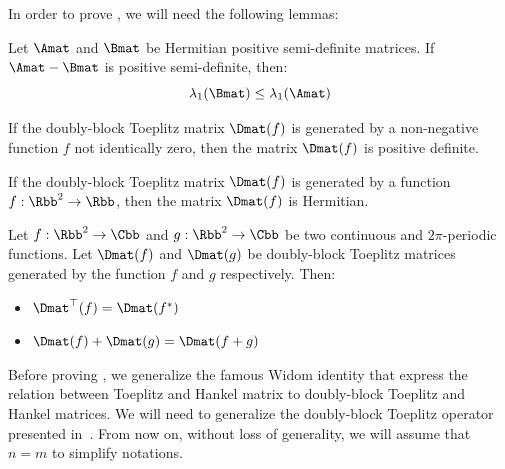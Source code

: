 In order to prove , we will need the following lemmas:

\begin{lemma} \label{theorem:diff_positive_semidefinite_matrices}
Let $\Amat$ and $\Bmat$ be Hermitian positive semi-definite matrices. If $\Amat - \Bmat$ is positive semi-definite, then:
  \begin{equation}
      \lambda_1 \left( \Bmat \right) \leq \lambda_1 \left( \Amat \right)
  \end{equation}
  \removespace
\end{lemma}

\begin{lemma} \label{theorem:block_toeplitz_positive_definite}
  If the doubly-block Toeplitz matrix $\Dmat(f)$ is generated by a non-negative function $f$ not identically zero, then the matrix $\Dmat(f)$ is positive definite. 
\end{lemma}

\begin{lemma} \label{theorem:block_toeplitz_hermitian}
  If the doubly-block Toeplitz matrix $\Dmat(f)$ is generated by a function $f: \Rbb^2 \rightarrow \Rbb$, then the matrix $\Dmat(f)$ is Hermitian. 
\end{lemma}

\begin{lemma} \label{theorem:properties_block_toeplitz}
  Let $f:\Rbb^2 \rightarrow \Cbb$ and $g:\Rbb^2 \rightarrow \Cbb$ be two continuous and $2\pi$-periodic functions. Let $\Dmat(f)$ and $\Dmat(g)$ be doubly-block Toeplitz matrices generated by the function $f$ and $g$ respectively. Then:
  \begin{itemize}
      \item $\Dmat^\top(f) = \Dmat(f^*)$
      \item $\Dmat(f) + \Dmat(g) = \Dmat(f + g)$
  \end{itemize}
  \removespace
\end{lemma}

Before proving , we generalize the famous Widom identity \cite{widom1976asymptotic} that express the relation between Toeplitz and Hankel matrix to doubly-block Toeplitz and Hankel matrices.
We will need to generalize the doubly-block Toeplitz operator presented in~.
From now on, without loss of generality, we will assume that $n=m$ to simplify notations. 

